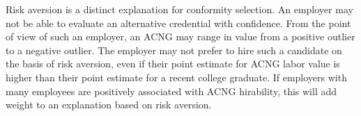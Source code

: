 \documentclass[review]{elsarticle}
\begin{document}
Risk aversion is a distinct explanation for conformity selection.
An employer may not be able to evaluate an alternative credential with confidence.
From the point of view of such an employer, an ACNG may range in value from a positive outlier to a negative outlier.
The employer may not prefer to hire such a candidate on the basis of risk aversion,
even if their point estimate for ACNG labor value is higher than their point estimate for a recent college graduate.
If employers with many employees are positively associated with ACNG hirability, this will add weight to an explanation based on risk aversion.
\end{document}
